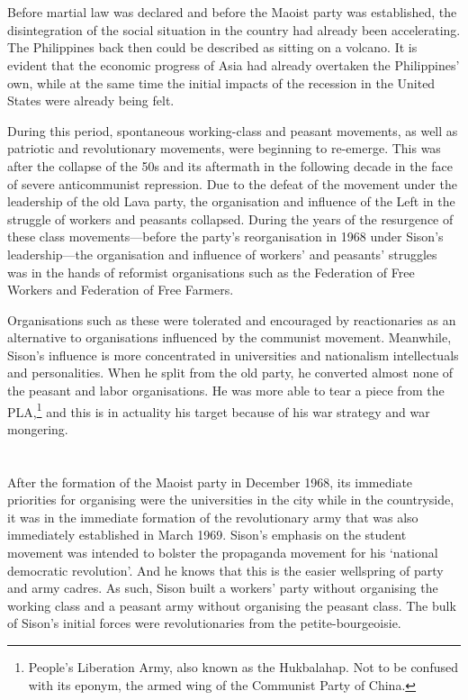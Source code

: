 \section{}
Before martial law was declared 
and before the Maoist party was established, 
the disintegration of the social situation in the country 
had already been accelerating.
The Philippines back then could be described as sitting on a volcano.
It is evident that 
the economic progress of Asia had already overtaken the Philippines' own,
while at the same time the initial impacts of the recession in the United States
were already being felt.

During this period, 
spontaneous working-class and peasant movements, 
as well as patriotic and revolutionary movements, 
were beginning to re-emerge.
This was after the collapse of the 50s 
and its aftermath in the following decade 
in the face of severe anticommunist repression.
Due to the defeat of the movement 
under the leadership of the old Lava party, 
the organisation and influence of the Left 
in the struggle of workers and peasants collapsed.
During the years of the resurgence of these class movements---before 
the party's reorganisation in 1968 under Sison's leadership---the 
organisation and influence of workers' and peasants' struggles 
was in the hands of reformist organisations 
such as the Federation of Free Workers 
and Federation of Free Farmers.

Organisations such as these 
were tolerated and encouraged by reactionaries 
as an alternative to organisations 
influenced by the communist movement. 
Meanwhile, Sison's influence is more concentrated 
in universities and nationalism intellectuals and personalities. 
When he split from the old party, 
he converted almost none of the peasant and labor organisations. 
He was more able to tear a piece from the PLA,\footnote{
    People's Liberation Army, also known as the Hukbalahap.
    Not to be confused with its eponym, 
    the armed wing of the Communist Party of China.
}
and this is in actuality his target 
because of his war strategy and war mongering.


\section{}
After the formation of the Maoist party in December 1968, 
its immediate priorities for organising 
were the universities in the city
while in the countryside, 
it was in the immediate formation 
of the revolutionary army 
that was also immediately established in March 1969. 
Sison's emphasis on the student movement 
was intended to bolster the propaganda movement 
for his `national democratic revolution'.
And he knows that this is the easier wellspring of party and army cadres. 
As such, Sison built a workers' party without organising the working class
and a peasant army without organising the peasant class. 
The bulk of Sison's initial forces 
were revolutionaries from the petite-bourgeoisie.

